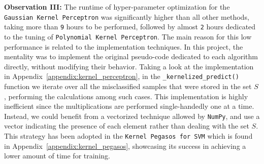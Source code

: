 {\bf Observation III:} The runtime of hyper-parameter optimization for the \texttt{Gaussian Kernel Perceptron} was significantly higher than all other methods, taking more than \texttt{9} hours to be performed, followed by almost \texttt{2} hours dedicated to the tuning of \texttt{Polynomial Kernel Perceptron}. The main reason for this low performance is related to the implementation techniques. In this project, the mentality was to implement the original pseudo-code dedicated to each algorithm directly, without modifying their behavior. Taking a look at the implementation in Appendix~\ref{appendix:kernel_perceptron}, in the \texttt{\_kernelized\_predict()} function we iterate over all the misclassified samples that were stored in the set $S$, performing the calculations among such cases. This implementation is highly inefficient since the multiplications are performed single-handedly one at a time. Instead, we could benefit from a vectorized technique allowed by \texttt{NumPy}, and use a vector indicating the presence of each element rather than dealing with the set $S$. This strategy has been adopted in the \texttt{Kernel Pegasos for SVM} which is found in Appendix~\ref{appendix:kernel_pegasos}, showcasing its success in achieving a lower amount of time for training.
